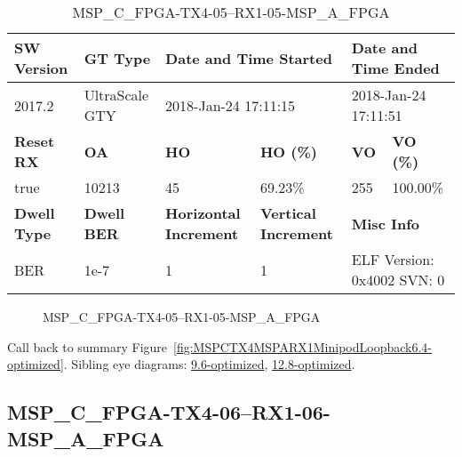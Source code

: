\begin{table}[h]
\centering
\caption{MSP\_C\_FPGA-TX4-05--RX1-05-MSP\_A\_FPGA}
\label{tab:MSPCFPGATX405RX105MSPAFPGA6.4-optimized}
\begin{tabular}{@{}|l|l|l|l|l|l|@{}}
\toprule
\textbf{SW Version}                & \textbf{GT Type}   & \multicolumn{2}{l|}{\textbf{Date and Time Started}}            & \multicolumn{2}{l|}{\textbf{Date and Time Ended}}        \\ \midrule
2017.2                       & UltraScale GTY          & \multicolumn{2}{l|}{2018-Jan-24 17:11:15}                   & \multicolumn{2}{l|}{2018-Jan-24 17:11:51}               \\ \midrule
\textbf{Reset RX}                  & \textbf{OA} & \textbf{HO}   & \textbf{HO (\%)} & \textbf{VO} & \textbf{VO (\%)} \\ \midrule
true & 10213        & 45          & 69.23\%        & 255        & 100.00\%       \\ \midrule
\textbf{Dwell Type}                & \textbf{Dwell BER} & \textbf{Horizontal Increment} & \textbf{Vertical Increment}    & \multicolumn{2}{l|}{\textbf{Misc Info}}                  \\ \midrule
BER                            & 1e-7        & 1        & 1           & \multicolumn{2}{l|}{ELF Version: 0x4002 SVN: 0}                         \\ \bottomrule
\end{tabular}
\end{table}

\begin{figure}[h]
\caption{MSP\_C\_FPGA-TX4-05--RX1-05-MSP\_A\_FPGA} \label{fig:MSPCFPGATX405RX105MSPAFPGA6.4-optimized}
\end{figure}

Call back to summary Figure~\ref{fig:MSPCTX4MSPARX1MinipodLoopback6.4-optimized}.
Sibling eye diagrams: \hyperref[sec:MSPCFPGATX405RX105MSPAFPGA9.6-optimized]{9.6-optimized}, \hyperref[sec:MSPCFPGATX405RX105MSPAFPGA12.8-optimized]{12.8-optimized}.

\clearpage
\newpage


\subsection{MSP\_C\_FPGA-TX4-06--RX1-06-MSP\_A\_FPGA}\label{sec:MSPCFPGATX406RX106MSPAFPGA6.4-optimized}

